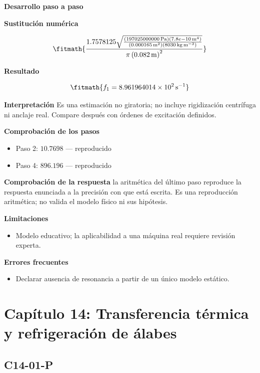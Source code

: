 \documentclass[10pt,openany]{book}
\begin{document}
\noindent\textbf{Desarrollo paso a paso}



\noindent\textbf{Sustitución numérica}

\[
\fitmath{\frac{1.7578125 \sqrt{\frac{\left(197025000000\,\mathrm{Pa}\right) \left(7.8e-10\,\mathrm{m}^{4}\right)}{\left(0.000165\,\mathrm{m}^{2}\right) \left(8030\,\mathrm{kg}\,\mathrm{m}^{-3}\right)}}}{\pi \left(0.082\,\mathrm{m}\right)^{2}}}
\]

\noindent\textbf{Resultado}

\[
\fitmath{f_1=8.961964014\times10^{2}\,\mathrm{s}^{-1}}
\]

\noindent\textbf{Interpretación}
Es una estimación no giratoria; no incluye rigidización centrífuga ni anclaje real. Compare después con órdenes de excitación definidos.

\noindent\textbf{Comprobación de los pasos}
\begin{itemize}
\item Paso 2: $10.7698$ — reproducido
\item Paso 4: $896.196$ — reproducido
\end{itemize}

\noindent\textbf{Comprobación de la respuesta} la aritmética del último paso reproduce la respuesta enunciada a la precisión con que está escrita. Es una reproducción aritmética; no valida el modelo físico ni sus hipótesis.

\noindent\textbf{Limitaciones}
\begin{itemize}
\item Modelo educativo; la aplicabilidad a una máquina real requiere revisión experta.
\end{itemize}

\noindent\textbf{Errores frecuentes}
\begin{itemize}
\item Declarar ausencia de resonancia a partir de un único modelo estático.
\end{itemize}
\section{Capítulo 14: Transferencia térmica y refrigeración de álabes}
\subsection*{C14-01-P}
\end{document}
